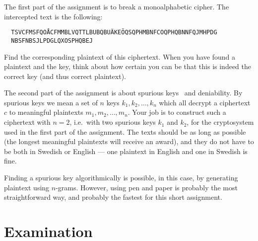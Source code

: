 \documentclass[a4paper]{article}
\begin{document}
The first part of the assignment is to break a monoalphabetic cipher.
The intercepted text is the following:
\begin{verbatim}
  TSVCFMSFQOÅCFMMBLVQTTLBUBQBUÄKEÖQSQPHMBNFCOQPHQBNNFQJMHPDG
  NBSFNBSJLPDGLQXOSPHQBEJ
\end{verbatim}
Find the corresponding plaintext of this ciphertext.
When you have found a plaintext and the key, think about how certain you can be 
that this is indeed the correct key (and thus correct plaintext).

The second part of the assignment is about spurious 
keys~\cite[Chap.~2]{Stinson2006cta} and deniability.
By spurious keys we mean a set of \(n\) keys \(k_1, k_2, \dotsc, k_n\) which 
all decrypt a ciphertext \(c\) to meaningful plaintexts \(m_1, m_2, \ldots, 
  m_n\).
Your job is to construct such a ciphertext with \(n = 2\), i.e.\ with two 
spurious keys \(k_1\) and \(k_2\), for the cryptosystem used in the first part 
of the assignment.
The texts should be as long as possible (the longest meaningful plaintexts will 
receive an award), and they do not have to be both in Swedish or English --- 
one plaintext in English and one in Swedish is fine.

Finding a spurious key algorithmically is possible, in this case, by generating 
plaintext using \(n\)-grams.
However, using pen and paper is probably the most straightforward way, and 
probably the fastest for this short assignment.


\section{Examination}
\end{document}
